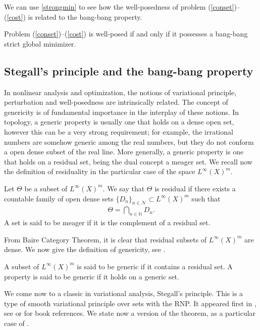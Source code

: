 \documentclass[hidelinks,onefignum,onetabnum]{siamart220329}
\begin{document}
We can use \cref{strongmin} to see how the well-posedness of problem (\ref{conset})--(\ref{cost}) is related to the bang-bang property.

\begin{corollary}\label{wpbb}
	Problem (\ref{conset})--(\ref{cost}) is well-posed if and only if it possesses a bang-bang strict global minimizer.
\end{corollary}


\subsection{Stegall's principle and the bang-bang property}
In nonlinear analysis and
optimization,  the notions of variational principle, perturbation and well-posedness are intrinsically related. The concept of genericity is of  fundamental importance in the interplay of these notions. In topology, a generic property is usually one that holds on a dense open set, however this can be a very strong requirement; for example, the irrational numbers are somehow generic among the real numbers, but they do not conform a open dense subset of the real line. 
 More generally, a generic property is one that holds on a residual set, being the dual concept a meager set. We recall now the definition of residuality in the particular case of the space ${L^\infty(X)^m}$.
\begin{definition}
	Let $\Theta$ be a subset of ${L^\infty(X)^m}$. We say that $\Theta$ is residual if there exists a countable family of open dense sets $\{D_n\}_{n\in\mathcal N}\subset {L^\infty(X)^m}$ such that 
	\begin{align*}
		\Theta=\bigcap_{n\in\mathbb N} D_n.
	\end{align*}
A set is said to be meager if it is the complement of a residual set.
\end{definition}
From Baire Category Theorem, it is clear that residual subsets of ${L^\infty(X)^m}$ are dense. We now give the definition of genericity, see \cite[Section 7]{Penot2013}. 
\begin{definition}
	A subset of ${L^\infty(X)^m}$ is said to be generic if it contains a residual set. A property is said to be generic if it holds on a generic set.
\end{definition}
We come now to a classic in variational analysis,  Stegall's  principle. This is a type of smooth variational principle over sets with the RNP.  It appeared first in \cite[pp. 174-176]{Stegall}, see \cite[Theorem 1.153]{Penot2013} or \cite[Theorem 6.3.5]{VarTech} for book references. We state now a version of the theorem, as a particular case of  \cite[Theorem 5]{Lassonde}.
\end{document}
